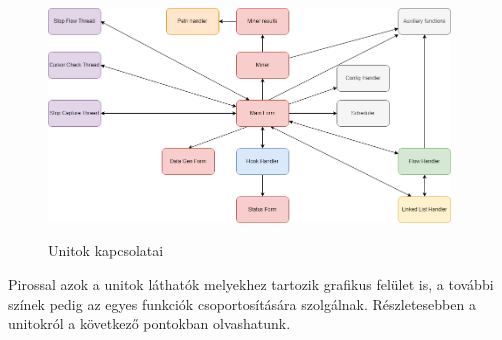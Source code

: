 \begin{figure}[h]
	\begin{center}
		\includegraphics[width=0.95\textwidth, keepaspectratio=true]{images/unitok_kapcsolati_abra}\\
		\label{fig:example}
	\end{center}
	\caption{Unitok kapcsolatai}
\end{figure}

Pirossal azok a unitok láthatók melyekhez tartozik grafikus felület is, a további színek pedig az egyes funkciók csoportosítására szolgálnak. Részletesebben a unitokról a következő pontokban olvashatunk.

